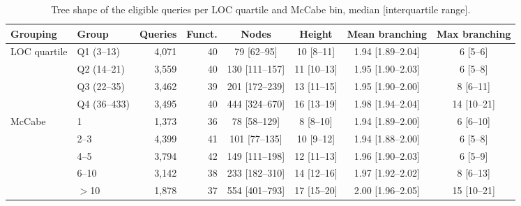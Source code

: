 \begin{table}[!htbp]
\centering
\caption{Tree shape of the eligible queries per LOC quartile and McCabe bin, median [interquartile range].}
\label{tab:d1}
\scriptsize
\setlength{\tabcolsep}{2.5pt}
\begin{tabular}{llrrcccc}
\toprule
Grouping & Group & Queries & Funct. & Nodes & Height & Mean branching & Max branching \\
\midrule
LOC quartile & Q1 (3--13) & 4,071 & 40 & 79 [62--95] & 10 [8--11] & 1.94 [1.89--2.04] & 6 [5--6] \\
 & Q2 (14--21) & 3,559 & 40 & 130 [111--157] & 11 [10--13] & 1.95 [1.90--2.03] & 6 [5--8] \\
 & Q3 (22--35) & 3,462 & 39 & 201 [172--239] & 13 [11--15] & 1.95 [1.90--2.00] & 8 [6--11] \\
 & Q4 (36--433) & 3,495 & 40 & 444 [324--670] & 16 [13--19] & 1.98 [1.94--2.04] & 14 [10--21] \\
\midrule
McCabe & 1 & 1,373 & 36 & 78 [58--129] & 8 [8--10] & 1.94 [1.89--2.00] & 6 [6--10] \\
 & 2--3 & 4,399 & 41 & 101 [77--135] & 10 [9--12] & 1.94 [1.88--2.00] & 6 [5--8] \\
 & 4--5 & 3,794 & 42 & 149 [111--198] & 12 [11--13] & 1.96 [1.90--2.03] & 6 [5--9] \\
 & 6--10 & 3,142 & 38 & 233 [182--310] & 14 [12--16] & 1.97 [1.92--2.02] & 8 [6--13] \\
 & $>$10 & 1,878 & 37 & 554 [401--793] & 17 [15--20] & 2.00 [1.96--2.05] & 15 [10--21] \\
\bottomrule
\end{tabular}
\end{table}

